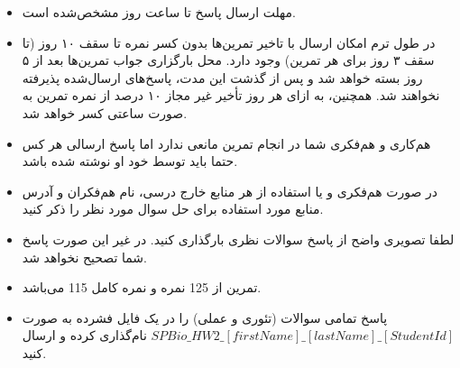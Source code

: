 \begin{itemize}
	\small
	\setlength\itemsep{0.05em}
	\item
	مهلت ارسال پاسخ تا ساعت  روز مشخص‌شده است.
	\item
	در طول ترم امکان ارسال با تاخیر تمرین‌ها بدون کسر نمره تا سقف ۱۰ روز (تا سقف ۳ روز برای هر تمرین) وجود دارد. محل بارگزاری جواب تمرین‌ها بعد از ۵ روز بسته خواهد شد و پس از گذشت این مدت، پاسخ‌های ارسال‌شده پذیرفته نخواهند ‌شد. همچنین، به ازای هر روز تأخیر غیر مجاز ۱۰ درصد از نمره تمرین به صورت ساعتی کسر خواهد شد.
	\item		
	هم‌کاری و هم‌فکری شما در انجام تمرین مانعی ندارد اما پاسخ ارسالی هر کس حتما باید توسط خود او نوشته شده‌ باشد. 
	\item
	در صورت هم‌فکری و یا استفاده از هر منابع خارج درسی، نام هم‌فکران و آدرس منابع مورد استفاده ‌برای حل سوال مورد نظر را ذکر‌ کنید.
	\item
	لطفا تصویری واضح از پاسخ سوالات نظری بارگذاری کنید. در غیر این صورت پاسخ شما تصحیح نخواهد شد.
	\item
	تمرین از 125 نمره و نمره کامل 115 می‌باشد.
	\item
	\footnotesize
پاسخ تمامی سوالات (تئوری و عملی) را در یک فایل فشرده به صورت 
\scriptsize
	$SPBio\_HW2\_[firstName]\_[lastName]\_[StudentId]$
	\footnotesize
	نام‌گذاری کرده و ارسال کنید.
\end{itemize}